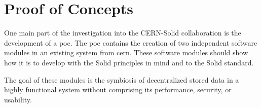 \section{Proof of Concepts}

One main part of the investigation into the CERN-Solid collaboration is the development of a \gls{poc}. The \gls{poc} contains the creation of two independent software modules in an existing system from \gls{cern}. These software modules should show how it is to develop with the Solid principles in mind and to the Solid standard.

The goal of these modules is the symbiosis of decentralized stored data in a highly functional system without comprising its performance, security, or usability.




